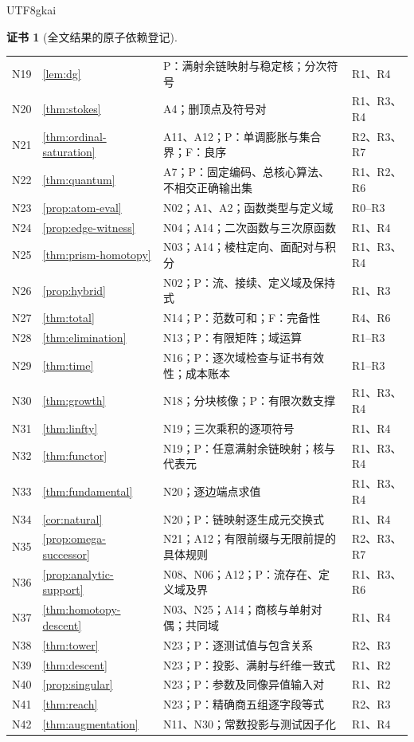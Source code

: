 \documentclass[12pt]{report}
\theoremstyle{definition}
\newtheorem{Certificate}{证书}[chapter]
\begin{document}
\begin{CJK*}{UTF8}{gkai}
\begin{Certificate}[全文结果的原子依赖登记]
\begin{longtable}{p{}p{}p{}p{}}
N19 & \ref{lem:dg} & P：满射余链映射与稳定核；分次符号 & R1、R4\\
N20 & \ref{thm:stokes} & A4；删顶点及符号对 & R1、R3、R4\\
N21 & \ref{thm:ordinal-saturation} & A11、A12；P：单调膨胀与集合界；F：良序 & R2、R3、R7\\
N22 & \ref{thm:quantum} & A7；P：固定编码、总核心算法、不相交正确输出集 & R1、R2、R6\\
N23 & \ref{prop:atom-eval} & N02；A1、A2；函数类型与定义域 & R0--R3\\
N24 & \ref{prop:edge-witness} & N04；A14；二次函数与三次原函数 & R1、R4\\
N25 & \ref{thm:prism-homotopy} & N03；A14；棱柱定向、面配对与积分 & R1、R3、R4\\
N26 & \ref{prop:hybrid} & N02；P：流、接续、定义域及保持式 & R1、R3\\
N27 & \ref{thm:total} & N14；P：范数可和；F：完备性 & R4、R6\\
N28 & \ref{thm:elimination} & N13；P：有限矩阵；域运算 & R1--R3\\
N29 & \ref{thm:time} & N16；P：逐次域检查与证书有效性；成本账本 & R1--R3\\
N30 & \ref{thm:growth} & N18；分块核像；P：有限次数支撑 & R1、R3、R4\\
N31 & \ref{thm:linfty} & N19；三次乘积的逐项符号 & R1、R4\\
N32 & \ref{thm:functor} & N19；P：任意满射余链映射；核与代表元 & R1、R3、R4\\
N33 & \ref{thm:fundamental} & N20；逐边端点求值 & R1、R3、R4\\
N34 & \ref{cor:natural} & N20；P：链映射逐生成元交换式 & R1、R4\\
N35 & \ref{prop:omega-successor} & N21；A12；有限前缀与无限前提的具体规则 & R2、R3、R7\\
N36 & \ref{prop:analytic-support} & N08、N06；A12；P：流存在、定义域及界 & R1、R3、R6\\
N37 & \ref{thm:homotopy-descent} & N03、N25；A14；商核与单射对偶；共同域 & R1、R4\\
N38 & \ref{thm:tower} & N23；P：逐测试值与包含关系 & R2、R3\\
N39 & \ref{thm:descent} & N23；P：投影、满射与纤维一致式 & R1、R2\\
N40 & \ref{prop:singular} & N23；P：参数及同像异值输入对 & R1、R2\\
N41 & \ref{thm:reach} & N23；P：精确商五组逐字段等式 & R2、R3\\
N42 & \ref{thm:augmentation} & N11、N30；常数投影与测试因子化 & R1、R4\\

\end{longtable}
\end{Certificate}
\end{CJK*}
\end{document}
